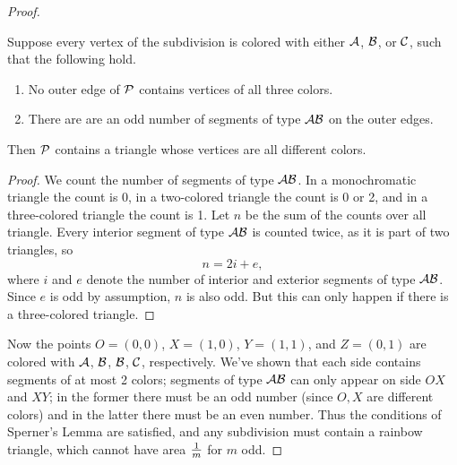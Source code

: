 \begin{proof}
\begin{lem}
Suppose every vertex of the subdivision is colored with either $\cal A$, $\cal B$, or $\cal C$, such that the following hold.
\begin{enumerate}
\item No outer edge of $\cal P$ contains vertices of all three colors.
\item There are are an odd number of segments of type $\cal A\cal B$ on the outer edges.
\end{enumerate}
Then $\cal P$ contains a triangle whose vertices are all different colors.
\end{lem}
\begin{proof}
We count the number of segments of type $\cal A\cal B$. In a monochromatic triangle the count is 0, in a two-colored triangle the count is 0 or 2, and in a three-colored triangle the count is 1. Let $n$ be the sum of the counts over all triangle. Every interior segment of type $\cal A\cal B$ is counted twice, as it is part of two triangles, so
\[
n=2i+e,
\]
where $i$ and $e$ denote the number of interior and exterior segments of type $\cal A\cal B$. Since $e$ is odd by assumption, $n$ is also odd. But this can only happen if there is a three-colored triangle.
\end{proof}
Now the points $O=(0,0)$, $X=(1,0)$, $Y=(1,1)$, and $Z=(0,1)$ are colored with $\cal A$, $\cal B$, $\cal B$, $\cal C$, respectively. We've shown that each side contains segments of at most 2 colors; segments of type $\cal A\cal B$ can only appear on side $OX$ and $XY$; in the former there must be an odd number (since $O,X$ are different colors) and in the latter there must be an even number. Thus the conditions of Sperner's Lemma are satisfied, and any subdivision must contain a rainbow triangle, which cannot have area $\rc m$ for $m$ odd.
\end{proof}
